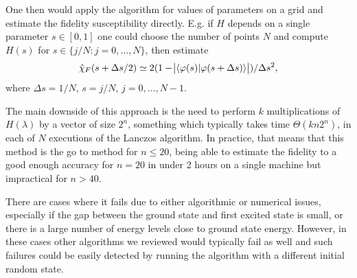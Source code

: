 \documentclass[american,aps,pra,reprint,floatfix,nofootinbib,superscriptaddress]{revtex4-2}
\begin{document}
One then would apply the algorithm for values of parameters on a grid
and estimate the fidelity susceptibility directly. E.g. if $H$ depends
on a single parameter $s\in[0,1]$ one could choose the number of points $N$
and compute $H(s)$ for $s\in\{j/N: j=0,\dots,N\}$, then estimate
\begin{equation}
  \hat \chi_F(s + \Delta s/2)
    \simeq 2 (1 - \abs{\braket{\varphi(s)| \varphi(s + \Delta s)}})
      / \Delta s^2,
\end{equation}
where $\Delta s = 1/N$, $s = j/N$, $j=0,\dots,N-1$.

The main downside of this approach is the need to perform $k$
multiplications of $H(\lambda)$ by a vector of size $2^n$, something
which typically takes time $\Theta(kn2^n)$, in each of $N$ executions
of the Lanczos algorithm. In practice, that means that
this method is the go to method for $n \leq 20$, being able to estimate
the fidelity to a good enough accuracy for $n=20$ in under 2 hours on a
single machine but impractical for $n > 40$.

There are cases where it fails due to either algorithmic or numerical issues,
especially if the gap between the ground state and first excited state is small,
or there is a large number of energy levels close to ground state energy.
However, in these cases other algorithms we reviewed would typically fail
as well and such failures could be easily detected by running the algorithm
with a different initial random state.
\end{document}
